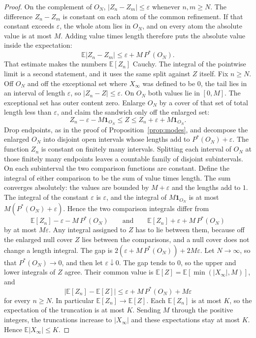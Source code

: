 \begin{proof}
On the complement of $O_N$, $|Z_n-Z_m|\le\varepsilon$ whenever $n,m\ge N$. The difference $Z_n-Z_m$ is constant on each atom of the common refinement. If that constant exceeds $\varepsilon$, the whole atom lies in $O_N$, and on every atom the absolute value is at most $M$. Adding value times length therefore puts the absolute value inside the expectation:
\[
 \mathbb E|Z_n-Z_m|\le\varepsilon+M\,P^*(O_N).
\]
That estimate makes the numbers $\mathbb E[Z_n]$ Cauchy. The integral of the pointwise limit is a second statement, and it uses the same split against $Z$ itself. Fix $n\ge N$. Off $O_N$ and off the exceptional set where $X_\infty$ was defined to be $0$, the tail lies in an interval of length $\varepsilon$, so $|Z_n-Z|\le\varepsilon$. On $O_N$ both values lie in $[0,M]$. The exceptional set has outer content zero. Enlarge $O_N$ by a cover of that set of total length less than $\varepsilon$, and claim the sandwich only off the enlarged set:
\[
 Z_n-\varepsilon-M\mathbf 1_{O_N}\le Z\le Z_n+\varepsilon+M\mathbf 1_{O_N}.
\]
Drop endpoints, as in the proof of Proposition~\ref{prop:modes}, and decompose the enlarged $O_N$ into disjoint open intervals whose lengths add to $P^*(O_N)+\varepsilon$. The function $Z_n$ is constant on finitely many intervals. Splitting each interval of $O_N$ at those finitely many endpoints leaves a countable family of disjoint subintervals. On each subinterval the two comparison functions are constant. Define the integral of either comparison to be the sum of value times length. The sum converges absolutely: the values are bounded by $M+\varepsilon$ and the lengths add to $1$. The integral of the constant $\varepsilon$ is $\varepsilon$, and the integral of $M\mathbf 1_{O_N}$ is at most $M(P^*(O_N)+\varepsilon)$. Hence the two comparison integrals differ from
\[
 \mathbb E[Z_n]-\varepsilon-M\,P^*(O_N)
 \qquad\text{and}\qquad
 \mathbb E[Z_n]+\varepsilon+M\,P^*(O_N)
\]
by at most $M\varepsilon$. Any integral assigned to $Z$ has to lie between them, because off the enlarged null cover $Z$ lies between the comparisons, and a null cover does not change a length integral. The gap is $2(\varepsilon+M\,P^*(O_N))+2M\varepsilon$. Let $N\to\infty$, so that $P^*(O_N)\to0$, and then let $\varepsilon\downarrow0$. The gap tends to $0$, so the upper and lower integrals of $Z$ agree. Their common value is $\mathbb E[Z]=\mathbb E[\min(|X_\infty|,M)]$, and
\[
 \bigl|\mathbb E[Z_n]-\mathbb E[Z]\bigr|\le\varepsilon+M\,P^*(O_N)+M\varepsilon
\]
for every $n\ge N$. In particular $\mathbb E[Z_n]\to\mathbb E[Z]$. Each $\mathbb E[Z_n]$ is at most $K$, so the expectation of the truncation is at most $K$. Sending $M$ through the positive integers, the truncations increase to $|X_\infty|$ and these expectations stay at most $K$. Hence $\mathbb E|X_\infty|\le K$.
\end{proof}

